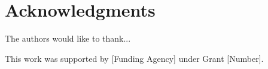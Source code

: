 
\section*{Acknowledgments}

The authors would like to thank...

This work was supported by [Funding Agency] under Grant [Number].

